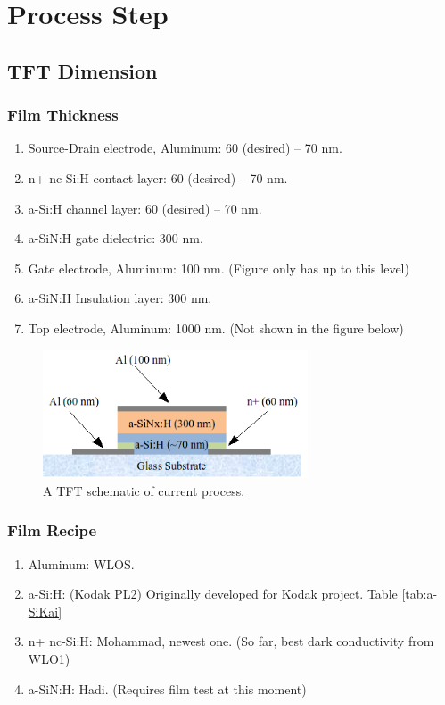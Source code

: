 \chapter{Process Step}
\section{TFT Dimension}
\label{thickness}
\subsection{Film Thickness}
\begin{enumerate}
\item Source-Drain electrode, Aluminum: 60 (desired) -- 70 nm.
\item n+ nc-Si:H contact layer: 60 (desired) -- 70 nm.
\item a-Si:H channel layer: 60 (desired) -- 70 nm.
\item a-SiN:H gate dielectric: 300 nm.
\item Gate electrode, Aluminum: 100 nm. (Figure only has up to this level)
\item a-SiN:H Insulation layer: 300 nm.
\item Top electrode, Aluminum: 1000 nm. (Not shown in the figure below)
\end{enumerate}
\begin{figure}[ht]
  \centering
  \includegraphics[width=0.7\textwidth]{TFT_Dimension.png}
  \caption{A TFT schematic of current process.}
  \label{fig:TFT_side}
\end{figure}
\subsection{Film Recipe}
\begin{enumerate}
\item Aluminum: WLOS.
\item a-Si:H: (Kodak PL2) Originally developed for Kodak project. Table \ref{tab:a-SiKai}
\item n+ nc-Si:H: Mohammad, newest one. (So far, best dark conductivity from WLO1)
\item a-SiN:H: Hadi. (Requires film test at this moment)
\end{enumerate}

